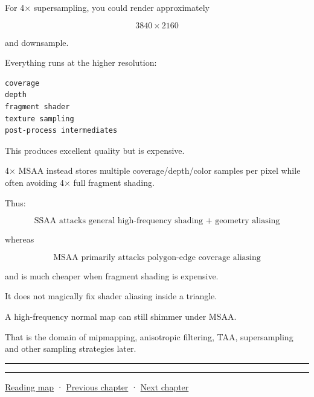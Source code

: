 For 4× supersampling, you could render approximately

\[
3840\times2160
\]

and downsample.

Everything runs at the higher resolution:

\begin{verbatim}
coverage
depth
fragment shader
texture sampling
post-process intermediates
\end{verbatim}

This produces excellent quality but is expensive.

4× MSAA instead stores multiple coverage/depth/color samples per pixel while often avoiding 4× full fragment shading.

Thus:

\[
\boxed{
\text{SSAA attacks general high-frequency shading + geometry aliasing}
}
\]

whereas

\[
\boxed{
\text{MSAA primarily attacks polygon-edge coverage aliasing}
}
\]

and is much cheaper when fragment shading is expensive.

It does not magically fix shader aliasing inside a triangle.

A high-frequency normal map can still shimmer under MSAA.

That is the domain of mipmapping, anisotropic filtering, TAA, supersampling and other sampling strategies later.

\begin{center}\rule{0.5\linewidth}{0.5pt}\end{center}

\begin{center}\rule{0.5\linewidth}{0.5pt}\end{center}

\hyperref[volume-reading-map]{Reading map} · \hyperref[03-visual-computing-i-ch012-probability-statistics-and-uncertainty]{Previous chapter} · \hyperref[03-visual-computing-i-ch014-transparency-blending-and-visibility]{Next chapter}
